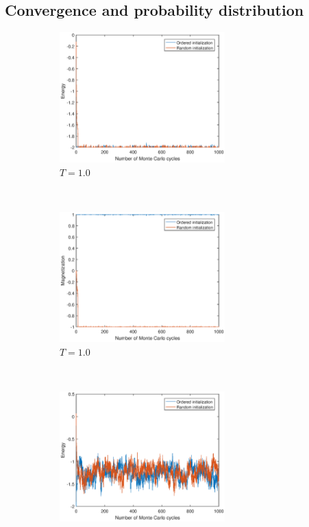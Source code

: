 \subsection{Convergence and probability distribution}\label{sec:detailresult}
\begin{figure}[tb]
	\begin{subfigure}[tb]{0.5\textwidth}
		\centering
		\includegraphics[width=0.7\textwidth]{Process_ene_lowT.eps}
		\caption{$T=1.0$}
	\end{subfigure}
	~
	\begin{subfigure}[tb]{0.5\textwidth}
		\centering
		\includegraphics[width=0.7\textwidth]{Process_mag_lowT.eps}		
		\caption{$T=1.0$}
	\end{subfigure}
	~
	\begin{subfigure}[tb]{0.5\textwidth}
		\centering
		\includegraphics[width=0.7\textwidth]{Process_ene_highT.eps}		

\end{subfigure}
\end{figure}
